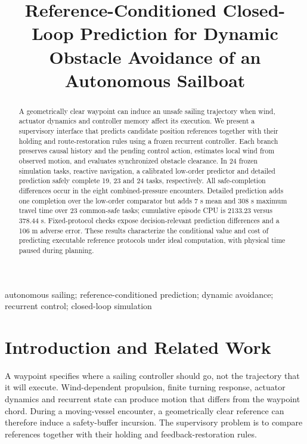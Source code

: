\documentclass[conference]{IEEEtran}
\begin{document}
\title{Reference-Conditioned Closed-Loop Prediction for Dynamic Obstacle Avoidance of an Autonomous Sailboat}

\author{}
\maketitle

\begin{abstract}
A geometrically clear waypoint can induce an unsafe sailing trajectory when wind, actuator dynamics and controller memory affect its execution. We present a supervisory interface that predicts candidate position references together with their holding and route-restoration rules using a frozen recurrent controller. Each branch preserves causal history and the pending control action, estimates local wind from observed motion, and evaluates synchronized obstacle clearance. In 24 frozen simulation tasks, reactive navigation, a calibrated low-order predictor and detailed prediction safely complete 19, 23 and 24 tasks, respectively. All safe-completion differences occur in the eight combined-pressure encounters. Detailed prediction adds one completion over the low-order comparator but adds 7 s mean and 308 s maximum travel time over 23 common-safe tasks; cumulative episode CPU is 2133.23 versus 378.44 s. Fixed-protocol checks expose decision-relevant prediction differences and a 106 m adverse error. These results characterize the conditional value and cost of predicting executable reference protocols under ideal computation, with physical time paused during planning.
\end{abstract}

\begin{IEEEkeywords}autonomous sailing; reference-conditioned prediction; dynamic avoidance; recurrent control; closed-loop simulation\end{IEEEkeywords}

\section{Introduction and Related Work}

A waypoint specifies where a sailing controller should go, not the trajectory that it will execute. Wind-dependent propulsion, finite turning response, actuator dynamics and recurrent state can produce motion that differs from the waypoint chord. During a moving-vessel encounter, a geometrically clear reference can therefore induce a safety-buffer incursion. The supervisory problem is to compare references together with their holding and feedback-restoration rules.
\end{document}
